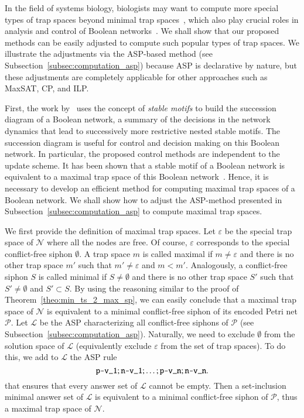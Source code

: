 \documentclass[preprint,12pt]{elsarticle}
\begin{document}
In the field of systems biology, biologists may want to compute more special types of trap spaces beyond minimal trap spaces~\cite{klarner2017pyboolnet}, which also play crucial roles in analysis and control of Boolean networks~\cite{cifuentes2020control,Rozum2021}.
We shall show that our proposed methods can be easily adjusted to compute such popular types of trap spaces.
We illustrate the adjustments via the ASP-based method (see Subsection~\ref{subsec:computation_asp}) because ASP is declarative by nature, but these adjustments are completely applicable for other approaches such as MaxSAT, CP, and ILP\@.

First, the work by~\cite{Rozum2021} uses the concept of \emph{stable motifs} to build the succession diagram of a Boolean network, a summary of the decisions in the network dynamics that lead to successively more restrictive nested stable motifs.
The succession diagram is useful for control and decision making on this Boolean network.
In particular, the proposed control methods are independent to the update scheme.
It has been shown that a stable motif of a Boolean network is equivalent to a maximal trap space of this Boolean network~\cite{Rozum2021}.
Hence, it is necessary to develop an efficient method for computing maximal trap spaces of a Boolean network.
We shall show how to adjust the ASP-method presented in Subsection~\ref{subsec:computation_asp} to compute maximal trap spaces.

We first provide the definition of maximal trap spaces.
Let \(\varepsilon\) be the special trap space of \(\mathcal{N}\) where all the nodes are free.
Of course, \(\varepsilon\) corresponds to the special conflict-free siphon \(\emptyset\).
A trap space \(m\) is called maximal if \(m \neq \varepsilon\) and there is no other trap space \(m'\) such that \(m' \neq \varepsilon\) and \(m < m'\).
Analogously, a conflict-free siphon \(S\) is called minimal if \(S \neq \emptyset\) and there is no other trap space \(S'\) such that \(S' \neq \emptyset\) and \(S' \subset S\).
By using the reasoning similar to the proof of Theorem~\ref{theo:min_ts_2_max_sp}, we can easily conclude that a maximal trap space of \(\mathcal{N}\) is equivalent to a minimal conflict-free siphon of its encoded Petri net \(\mathcal{P}\).
Let \(\mathcal{L}\) be the ASP characterizing all conflict-free siphons of \(\mathcal{P}\) (see Subsection~\ref{subsec:computation_asp}).
Naturally, we need to exclude \(\emptyset\) from the solution space of \(\mathcal{L}\) (equivalently exclude \(\varepsilon\) from the set of trap spaces).
To do this, we add to \(\mathcal{L}\) the ASP rule
\[
  \verb|p-v_1| ; \verb|n-v_1| ; \dots ; \verb|p-v_n| ; \verb|n-v_n|.
\]
that ensures that every answer set of \(\mathcal{L}\) cannot be empty.
Then a set-inclusion minimal answer set of \(\mathcal{L}\) is equivalent to a minimal conflict-free siphon of \(\mathcal{P}\), thus a maximal trap space of \(\mathcal{N}\).
\end{document}
